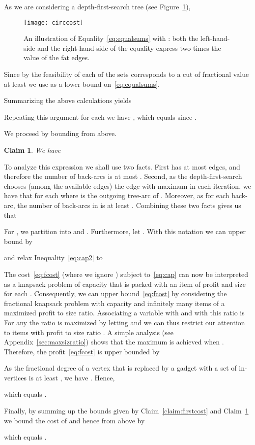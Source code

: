 \documentclass[letterpaper,11pt]{article}
\newtheorem{claim}[theorem]{Claim}
\newenvironment{proofclaim}{\begin{trivlist}
\item[\hskip\labelsep {\it Proof of Claim}.]}{\QED \end{trivlist}}
\newenvironment{proof}{\begin{trivlist}
\item[\hskip\labelsep {\bf Proof}.]}{\QED \end{trivlist}}
\newcommand{\QED}{\hfill }
\begin{document}
\begin{proof}
\begin{proofclaim}
As we are considering a depth-first-search tree (see
Figure~\ref{fig:circcostOLA}),

\begin{figure}[bt]
\begin{center}
\texttt{[image: circcost]}
\end{center}
\caption{An illustration of Equality~\eqref{eq:equalsums} with : both the
  left-hand-side and the right-hand-side of the equality express two
  times the value of the fat edges.}
\label{fig:circcostOLA}
\end{figure}
Since by the feasibility of  each of the sets corresponds to a cut of fractional value at least  we use  as a lower bound on~\eqref{eq:equalsums}.

\noindent Summarizing the above calculations yields


Repeating this argument for each  we have ,
which equals  since .
\end{proofclaim}
We proceed by bounding  from above.  
\begin{claim}
\label{claim:secondcost}
We have 
\end{claim}
\begin{proofclaim}
To analyze this expression we shall use two facts. First
 has at most  edges, and therefore the number of back-arcs
is at most .  Second, as the depth-first-search
chooses (among the available edges) the edge  with maximum  in
each iteration, we have that  for each  where  is the outgoing tree-arc of . Moreover, as  for each
back-arc, the number of back-arcs in  is at least .
Combining these two facts gives us that
 
For , we partition  into  and . Furthermore, let . With
this notation we can upper bound  by

and relax Inequality~\eqref{eq:cap2} to


The cost~\eqref{eq:fcost} (where we ignore ) subject
to~\eqref{eq:cap} can now be interpreted as a knapsack problem of
capacity  that is packed with an item of profit  and size  for each . Consequently, we can upper bound~\eqref{eq:fcost} by
considering the fractional knapsack problem with capacity  and
infinitely many items of a maximized profit to size ratio. Associating
a variable  with  and  with  this ratio is  For
any  the ratio is maximized by letting  and we can thus
restrict our attention to items with profit to size ratio
. A simple analysis (see Appendix~\ref{sec:maxsizratio})
shows that the maximum is achieved when . Therefore, the profit~\eqref{eq:fcost} is upper bounded by

As the fractional degree of a vertex  that is replaced by a gadget
with a set  of in-vertices is at least , we have . Hence,

which equals .
\end{proofclaim}
Finally, by summing up the bounds given by Claim~\ref{claim:firstcost}
and Claim~\ref{claim:secondcost} we bound the cost of  and hence  from above by

which equals .
\end{proof}
\end{document}
